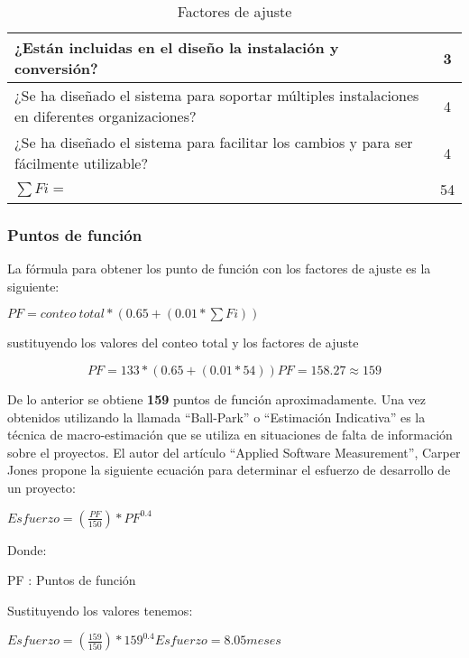 \begin{table}
\begin{tabular}{|p{9cm}|c|}
		¿Están incluidas en el diseño la instalación y conversión?                                                               & 3           \\ \hline
		¿Se ha diseñado el sistema para soportar múltiples instalaciones en diferentes organizaciones?                           & 4           \\ \hline
		¿Se ha diseñado el sistema para facilitar los cambios y para ser fácilmente utilizable?                                  & 4           \\ \hline
		\centering $\sum Fi=$                                                                                                  	 & 54          \\ \hline
		\end{tabular}
		\caption{Factores de ajuste}
		\label{tab:questions_adjusment}
		\end{table}


\subsubsection{Puntos de función}

La fórmula para obtener los punto de función con los factores de ajuste es la siguiente:


\begin{center}
	$
	PF = conteo\ total *  (0.65 + (0.01 * \sum Fi))
	$


	sustituyendo los valores del conteo total y los factores de ajuste


	\begin{equation}
		PF =  133 *  (0.65 + (0.01 * 54))
		PF = 158.27 \approx 159
	\end{equation}
\end{center}

De lo anterior se obtiene \textbf{159} puntos de función aproximadamente. Una vez obtenidos utilizando la llamada ``Ball-Park'' o ``Estimación Indicativa'' es la técnica de macro-estimación que se utiliza en situaciones de falta de información sobre el proyectos. El autor del artículo ``Applied Software Measurement''\cite{abran_applied_2006}, Carper Jones propone la siguiente ecuación para determinar el esfuerzo de desarrollo de un proyecto:


\begin{center}
	$
	Esfuerzo = (\frac{PF}{150})*PF^{0.4}
	$


	Donde:


	PF : Puntos de función


	Sustituyendo los valores tenemos:

	$
	Esfuerzo = (\frac{159}{150})*159^{0.4}
	Esfuerzo = 8.05 meses
	$
\end{center}


